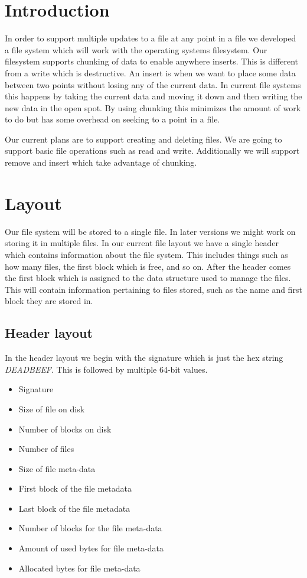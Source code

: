 \documentclass{article}
\begin{document}
\section*{Introduction}

In order to support multiple updates to a file at any point in a file we
developed a file system which will work with the operating systems filesystem.
Our filesystem supports chunking of data to enable anywhere inserts.
This is different from a write which is destructive.
An insert is when we want to place some data between two points without losing any of the current data.
In current file systems this happens by taking the current data and moving it down and then writing the new data in the open spot.
By using chunking this minimizes the amount of work to do but has some overhead on seeking to a point in a file.

Our current plans are to support creating and deleting files.
We are going to support basic file operations such as read and write.
Additionally we will support remove and insert which take advantage of chunking.


\section*{Layout}

Our file system will be stored to a single file.
In later versions we might work on storing it in multiple files.
In our current file layout we have a single header which contains information about the file system.
This includes things such as how many files, the first block which is free, and so on.
After the header comes the first block which is assigned to the data structure used to manage the files.
This will contain information pertaining to files stored, such as the name and first block they are stored in.

\subsection*{Header layout}

In the header layout we begin with the signature which is just the hex string {\it DEADBEEF}.
This is followed by multiple 64-bit values.

\begin{itemize}
    \item Signature
    \item Size of file on disk
    \item Number of blocks on disk
    \item Number of files
    \item Size of file meta-data
    \item First block of the file metadata
    \item Last block of the file metadata
    \item Number of blocks for the file meta-data
    \item Amount of used bytes for file meta-data
    \item Allocated bytes for file meta-data
\end{itemize}
\end{document}
